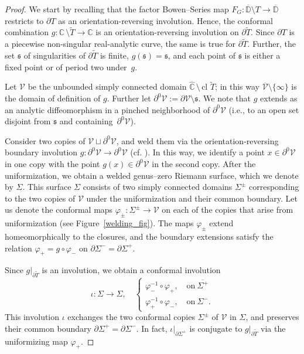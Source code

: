 \documentclass[11pt,a4paper, oneside]{amsart}
\theoremstyle{definition}
\theoremstyle{remark}
\numberwithin{equation}{section}
\def\D{{\mathbb{D}}}
\def\cV{\mathcal {V}}
\newcommand{\C}{\mathbb{C}}
\newcommand{\sm}{\setminus}
\renewcommand{\tilde}{\widetilde}
\newcommand{\clo}{{\text{cl}}\,\,}
\renewcommand{\phi}{\varphi}
\begin{document}
\begin{proof}
We start by recalling that the factor Bowen--Series map $F_G:\overline{\D}\setminus T\to\overline{\D}$ restricts to $\partial T$ as an orientation-reversing involution. Hence, the conformal combination $g \colon \C \, \sm \tilde T \to \C$ is an orientation-reversing involution on $\partial \widetilde{T}$.
Since $\partial T$ is a piecewise non-singular real-analytic curve, the same is true for $\partial\widetilde{T}$. Further, the set $\mathfrak{s}$ of singularities of $\partial\widetilde{T}$ is finite, $g(\mathfrak{s})=\mathfrak{s}$, and each point of $\mathfrak{s}$ is either a fixed point or of period two under~$g$.

Let $\cV$ be the unbounded simply connected domain $\widehat{\C}\,\setminus\,\clo{\widetilde{T}}$; in this way $\overline{\cV}\setminus\{\infty\}$ is the domain of definition of $g$. Further let $\partial^0 \cV:=\partial\cV\setminus\mathfrak{s}$. We note that $g$ extends as an analytic diffeomorphism in a pinched neighborhood of $\partial^0\cV$ (i.e., to an open set disjoint from $\mathfrak{s}$ and containing~$\partial^0 \cV$). 

Consider two copies of $\cV\sqcup\partial^0\cV$, and weld them via the orientation-reversing boundary involution $g:\partial^0\cV\to\partial^0\cV$ (cf. \cite[Chapter~2, Page~117]{AS60}). In this way, we identify a point $x \in \partial^0\cV$ in one copy with the point $g(x) \in \partial^0 \cV$ in the second copy. After the uniformization, we obtain a welded genus--zero Riemann surface, which we denote by $\Sigma$. This surface $\Sigma$ consists of two simply connected domains $\Sigma^\pm$ corresponding to the two copies of $\cV$ under the uniformization and their common boundary. Let us denote the conformal maps $\phi_\pm \colon \Sigma^\pm \to \cV$ on each of the copies that arise from uniformization (see Figure~\ref{welding_fig}). The maps $\phi_\pm$ extend homeomorphically to the closures, and the boundary extensions satisfy the relation $\phi_+=g\circ\phi_-$ on $\partial\Sigma^-=\partial\Sigma^+$.

Since $g\vert_{\partial\widetilde{T}}$ is an involution, we obtain a conformal involution \begin{equation*}
    \iota:\Sigma\to\Sigma,\quad 
    \begin{cases}
     \phi_-^{-1}\circ\phi_+,\quad \mathrm{on}\ \overline{\Sigma^+}  \\
     \phi_+^{-1}\circ\phi_-,\quad \mathrm{on}\ \Sigma^-.
    \end{cases}
\end{equation*} 
This involution $\iota$ exchanges the two conformal copies $\Sigma^\pm$ of $\cV$ in $\Sigma$, and preserves their common boundary $\partial \Sigma^+ = \partial \Sigma^-$. In fact, $\iota\vert_{\partial \Sigma^+}$ is conjugate to $g\vert_{\partial\widetilde{T}}$ via the uniformizing map $\phi_+$. 


\end{proof}
\end{document}
